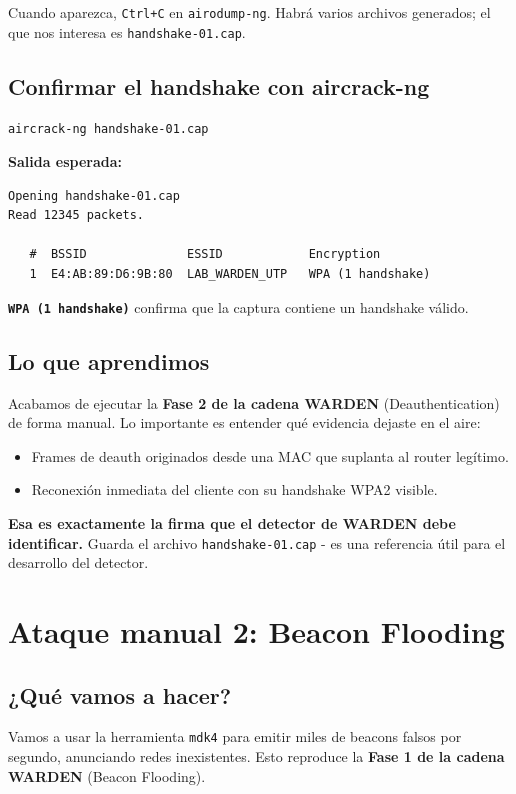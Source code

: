 \documentclass[11pt,a4paper]{article}
\begin{document}
Cuando aparezca, \texttt{Ctrl+C} en \texttt{airodump-ng}. Habrá varios
archivos generados; el que nos interesa es \texttt{handshake-01.cap}.

\subsection{Confirmar el handshake con aircrack-ng}

\begin{lstlisting}
aircrack-ng handshake-01.cap
\end{lstlisting}

\textbf{Salida esperada:}

\begin{lstlisting}
Opening handshake-01.cap
Read 12345 packets.

   #  BSSID              ESSID            Encryption
   1  E4:AB:89:D6:9B:80  LAB_WARDEN_UTP   WPA (1 handshake)
\end{lstlisting}

\textbf{\texttt{WPA (1 handshake)}} confirma que la captura contiene un
handshake válido.

\subsection{Lo que aprendimos}
Acabamos de ejecutar la \textbf{Fase 2 de la cadena WARDEN}
(Deauthentication) de forma manual. Lo importante es entender qué
evidencia dejaste en el aire:

\begin{itemize}
  \item Frames de deauth originados desde una MAC que suplanta al
    router legítimo.
  \item Reconexión inmediata del cliente con su handshake WPA2 visible.
\end{itemize}

\textbf{Esa es exactamente la firma que el detector de WARDEN debe
identificar.} Guarda el archivo \texttt{handshake-01.cap} - es una
referencia útil para el desarrollo del detector.

\section{Ataque manual 2: Beacon Flooding}

\subsection{¿Qué vamos a hacer?}
Vamos a usar la herramienta \texttt{mdk4} para emitir miles de beacons
falsos por segundo, anunciando redes inexistentes. Esto reproduce la
\textbf{Fase 1 de la cadena WARDEN} (Beacon Flooding).
\end{document}
